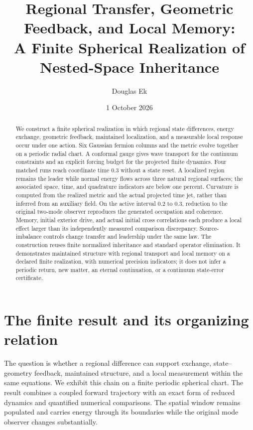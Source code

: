 \documentclass[11pt]{article}
\title{Regional Transfer, Geometric Feedback, and Local Memory:\\
A Finite Spherical Realization of Nested-Space Inheritance}
\author{Douglas Ek}
\date{1 October 2026}
\begin{document}
\maketitle
\begin{abstract}
We construct a finite spherical realization in which regional state differences,
energy exchange, geometric feedback, maintained localization, and a measurable
local response occur under one action. Six Gaussian fermion columns and the
metric evolve together on a periodic radial chart. A conformal gauge gives
wave transport for the continuum constraints and an explicit forcing budget
for the projected finite dynamics. Four matched runs reach coordinate time
0.3 without a state reset. A localized region remains the leader while
normal energy flows across three natural regional surfaces; the associated
space, time, and quadrature indicators are below one percent. Curvature is
computed from the realized metric and the actual projected time jet, rather
than inferred from an auxiliary field. On the active interval 0.2 to 0.3,
reduction to the original two-mode observer reproduces the generated
occupation and coherence. Memory, initial exterior drive, and actual initial
cross correlations each produce a local effect larger than its independently
measured comparison discrepancy. Source-imbalance controls change transfer and leadership
under the same law. The construction reuses finite normalized inheritance
and standard operator elimination. It demonstrates maintained structure
with regional transport and local memory on a declared finite realization, with
numerical precision indicators; it does not infer a periodic return,
new matter, an eternal continuation, or a continuum state-error certificate.
\end{abstract}

\section{The finite result and its organizing relation}
The question is whether a regional difference can support exchange,
state--geometry feedback, maintained structure, and a local measurement
within the same equations. We exhibit this chain on a finite periodic
spherical chart. The result combines a coupled forward trajectory with
an exact form of reduced dynamics and quantified numerical comparisons.
The spatial window remains populated and carries energy through its
boundaries while the original mode observer changes substantially.
\end{document}
